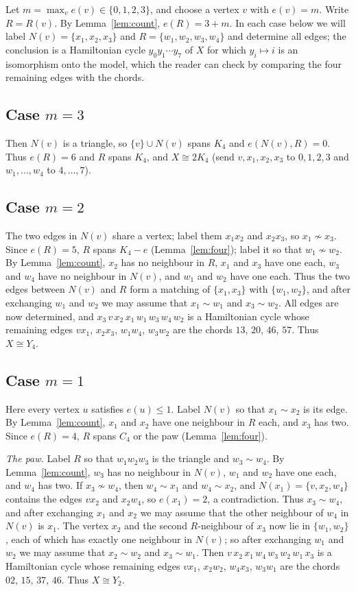 \documentclass[11pt]{amsart}
\theoremstyle{definition}
\newcommand{\nb}{N}
\begin{document}
Let $m=\max_v e(v)\in\{0,1,2,3\}$, and choose a vertex $v$ with $e(v)=m$. Write $R=R(v)$. By
Lemma~\ref{lem:count}, $e(R)=3+m$. In each case below we will label $\nb(v)=\{x_1,x_2,x_3\}$ and
$R=\{w_1,w_2,w_3,w_4\}$ and determine all edges; the conclusion is a Hamiltonian cycle
$y_0y_1\cdots y_7$ of $X$ for which $y_i\mapsto i$ is an isomorphism onto the model, which the
reader can check by comparing the four remaining edges with the chords.

\subsection*{\texorpdfstring{Case $m=3$}{Case m=3}}
Then $\nb(v)$ is a triangle, so $\{v\}\cup\nb(v)$ spans $K_4$ and $e(\nb(v),R)=0$. Thus
$e(R)=6$ and $R$ spans $K_4$, and $X\cong2K_4$ (send $v,x_1,x_2,x_3$ to $0,1,2,3$ and
$w_1,\dots,w_4$ to $4,\dots,7$).

\subsection*{\texorpdfstring{Case $m=2$}{Case m=2}}
The two edges in $\nb(v)$ share a vertex; label them $x_1x_2$ and $x_2x_3$, so $x_1\not\sim x_3$.
Since $e(R)=5$, $R$ spans $K_4-e$ (Lemma~\ref{lem:four}); label it so that $w_1\not\sim w_2$. By
Lemma~\ref{lem:count}, $x_2$ has no neighbour in $R$, $x_1$ and $x_3$ have one each, $w_3$ and
$w_4$ have no neighbour in $\nb(v)$, and $w_1$ and $w_2$ have one each. Thus the two edges between
$\nb(v)$ and $R$ form a matching of $\{x_1,x_3\}$ with $\{w_1,w_2\}$, and after exchanging $w_1$
and $w_2$ we may assume that $x_1\sim w_1$ and $x_3\sim w_2$. All edges are now determined, and
$x_3\,v\,x_2\,x_1\,w_1\,w_3\,w_4\,w_2$ is a Hamiltonian cycle whose remaining edges $vx_1$,
$x_2x_3$, $w_1w_4$, $w_3w_2$ are the chords $13$, $20$, $46$, $57$. Thus $X\cong Y_4$.

\subsection*{\texorpdfstring{Case $m=1$}{Case m=1}}
Here every vertex $u$ satisfies $e(u)\le1$. Label $\nb(v)$ so that $x_1\sim x_2$ is its edge. By
Lemma~\ref{lem:count}, $x_1$ and $x_2$ have one neighbour in $R$ each, and $x_3$ has two. Since
$e(R)=4$, $R$ spans $C_4$ or the paw (Lemma~\ref{lem:four}).

\emph{The paw.} Label $R$ so that $w_1w_2w_3$ is the triangle and $w_3\sim w_4$. By
Lemma~\ref{lem:count}, $w_3$ has no neighbour in $\nb(v)$, $w_1$ and $w_2$ have one each, and
$w_4$ has two. If $x_3\not\sim w_4$, then $w_4\sim x_1$ and $w_4\sim x_2$, and $\nb(x_1)=
\{v,x_2,w_4\}$ contains the edges $vx_2$ and $x_2w_4$, so $e(x_1)=2$, a contradiction. Thus
$x_3\sim w_4$, and after exchanging $x_1$ and $x_2$ we may assume that the other neighbour of $w_4$
in $\nb(v)$ is $x_1$. The vertex $x_2$ and the second $R$-neighbour of $x_3$ now lie in
$\{w_1,w_2\}$, each of which has exactly one neighbour in $\nb(v)$; so after exchanging $w_1$ and
$w_2$ we may assume that $x_2\sim w_2$ and $x_3\sim w_1$. Then $v\,x_2\,x_1\,w_4\,w_3\,w_2\,w_1\,x_3$
is a Hamiltonian cycle whose remaining edges $vx_1$, $x_2w_2$, $w_4x_3$, $w_3w_1$ are the chords
$02$, $15$, $37$, $46$. Thus $X\cong Y_2$.
\end{document}

